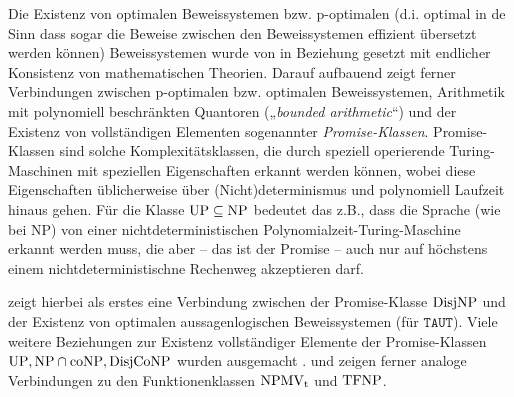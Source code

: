 Die Existenz von optimalen Beweissystemen bzw. p-optimalen (d.i. optimal in de Sinn dass sogar die Beweise zwischen den Beweissystemen effizient übersetzt werden können) Beweissystemen  wurde von \textcite{krajicek_propositional_1989} in Beziehung gesetzt mit endlicher Konsistenz von mathematischen Theorien. Darauf aufbauend zeigt \textcites[Kap.~6]{pudlak_logical_2013}{pudlak_incompleteness_2017} ferner Verbindungen zwischen p-optimalen bzw. optimalen Beweissystemen, Arithmetik mit polynomiell beschränkten Quantoren („\emph{bounded arithmetic}“) und der Existenz von vollständigen Elementen sogenannter \emph{Promise-Klassen}. Promise-Klassen sind solche Komplexitätsklassen, die durch speziell operierende Turing-Maschinen mit speziellen Eigenschaften erkannt werden können, wobei diese Eigenschaften üblicherweise über (Nicht)determinismus und polynomiell Laufzeit hinaus gehen. Für die Klasse $\mathrm{UP}\subseteq\mathrm{NP}$ bedeutet das z.B., dass die Sprache (wie bei NP) von einer nichtdeterministischen Polynomialzeit-Turing-Maschine erkannt werden muss, die aber -- das ist der Promise -- auch nur auf höchstens einem nichtdeterministischne Rechenweg akzeptieren darf.

\textcite{razborov_provably_1994} zeigt hierbei als erstes eine Verbindung zwischen der Promise-Klasse $\mathrm{DisjNP}$ und der Existenz von optimalen aussagenlogischen Beweissystemen (für $\mathtt{TAUT}$). Viele weitere Beziehungen zur Existenz vollständiger Elemente der Promise-Klassen $\mathrm{UP}, \mathrm{NP}\cap\mathrm{coNP}, \mathrm{DisjCoNP}$ wurden ausgemacht \parencites(vgl. auch)(){messner_simulation_2001}{kobler_optimal_2003}{beyersdorff_there_2011}.
\textcite{beyersdorff_nondeterministic_2009} und \textcite{pudlak_incompleteness_2017} zeigen ferner analoge Verbindungen zu den Funktionenklassen $\mathrm{NPMV_t}$ und $\mathrm{TFNP}$.


